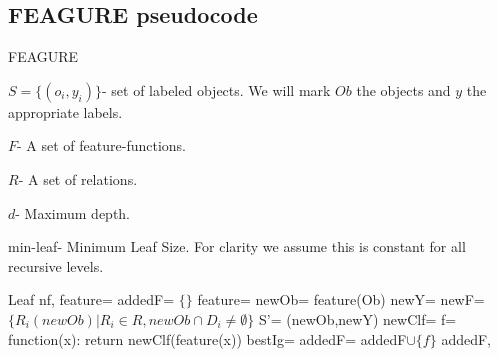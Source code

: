 \documentclass{article}
\theoremstyle{definition}
\begin{document}
\begin{appendices}
	\section{FEAGURE pseudocode} \label{app:2}
	
	\begin{algorithm}[H]
		\caption{FEAGURE}
		\label{code2}
		\small
		$S=\{(o_{i},y_{i})\}$- set of labeled objects. We will mark $Ob$ the objects and $y$ the appropriate labels.
		
		$F$- A set of feature-functions.
		
		$R$- A set of relations.
		
		$d$- Maximum depth.
		
		min-leaf- Minimum Leaf Size. For clarity we assume this is constant for all recursive levels.
		
		\begin{algorithmic}
					\State
					\Return Leaf
				\EndIf
				\State nf, feature= 
				\State {}
				\State
				\Return {}
			\EndFunction
				\State
				\Return {}
			\EndIf
			\State addedF= $\{\}$
				\State feature= 
				\State newOb= feature(Ob)
				\State newY= 
				\State newF= $\{R_{i}(newOb)|R_{i}\in R, newOb\cap D_{i}\neq\emptyset\}$
				\State S'= (newOb,newY)
				\State newClf= 
				\State f= function(x): return newClf(feature(x))
				\State bestIg= 
					\State addedF= addedF$\cup \{f\}$
				\EndIf
			\EndWhile
			\State
			\Return addedF, 
			\EndFunction
			
		\end{algorithmic}
	\end{algorithm}
	
\end{appendices}

\clearpage


\end{document}
